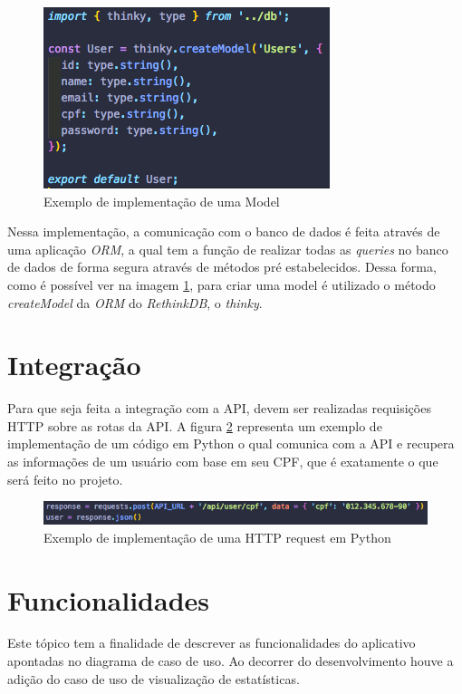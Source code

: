 \begin{figure}[!ht]
	\centering
		\includegraphics[scale=1]{figuras/software/model.png}
	\caption{Exemplo de implementação de uma Model}
	\label{fig:model}
\end{figure}

Nessa implementação, a comunicação com o banco de dados é feita através de uma aplicação \textit{ORM}, a qual tem a função de realizar todas as \textit{queries} no banco de dados de forma segura através de métodos pré estabelecidos. Dessa forma, como é possível ver na imagem \ref{fig:model}, para criar uma model é utilizado o método \textit{createModel} da \textit{ORM} do \textit{RethinkDB}, o \textit{thinky}.

\section{Integração}

Para que seja feita a integração com a API, devem ser realizadas requisições HTTP sobre as rotas da API. A figura \ref{fig:python} representa um exemplo de implementação de um código em Python o qual comunica com a API e recupera as informações de um usuário com base em seu CPF, que é exatamente o que será feito no projeto.

\begin{figure}[!ht]
	\centering
		\includegraphics[scale=0.7]{figuras/software/python.png}
	\caption{Exemplo de implementação de uma HTTP request em Python}
	\label{fig:python}
\end{figure}

\section{Funcionalidades}

Este tópico tem a finalidade de descrever as funcionalidades do aplicativo apontadas no diagrama de caso de uso. Ao decorrer do desenvolvimento houve a adição do caso de uso de visualização de estatísticas.

